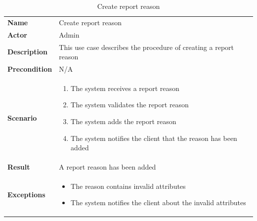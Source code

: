 \begin{table}[ht]
    \caption{Create report reason}
    \begin{tabular}{|L{5cm}|L{10cm}|}
        \toprule
        \textbf{Name}         & Create report reason                                              \\
        \textbf{Actor}        & Admin                                                             \\
        \textbf{Description}  & This use case describes the procedure of creating a report reason \\
        \textbf{Precondition} & N/A                                                               \\
        \textbf{Scenario} &
        \vspace{-0.75cm}
        \begin{enumerate}
            \setlength\itemsep{-0.5em}
            \item The system receives a report reason
            \item The system validates the report reason
            \item The system adds the report reason
            \item The system notifies the client that the reason has been added
        \end{enumerate} \\[-0.5cm]
        \textbf{Result}       & A report reason has been added                                    \\
        \textbf{Exceptions} &
        \vspace{-0.75cm}
        \begin{itemize}
            \setlength\itemsep{-0.5em}
            \item The reason contains invalid attributes
            \item The system notifies the client about the invalid attributes
        \end{itemize} \\
        \bottomrule
    \end{tabular}
    \label{tab:table26}
\end{table}

